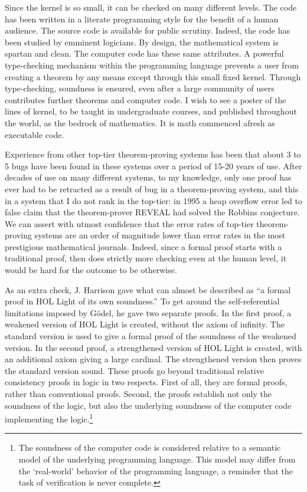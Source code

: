 \documentclass{llncs}
\begin{document}
Since the kernel is so small, it can be checked on many different levels.  The
code has been written in a literate programming style for the benefit
of a human audience.  The source code is available for public scrutiny.   Indeed, the code
has been studied by emminent logicians.  
By design, the mathematical system is spartan
and clean.  The computer code has these same attributes.   A powerful type-checking mechanism within the programming language prevents a user from creating a theorem by any means except through this small fixed kernel.  Through type-checking, soundness is ensured, even after
a large community of users contributes further theorems and computer code. 
I wish to see a poster of the lines of kernel, to be taught in undergraduate courses, and published throughout the world, as
the bedrock of mathematics.  It is math commenced afresh
as executable code.

Experience from other top-tier theorem-proving systems has been that about 3 to 5 bugs have been found
in these systems over a period of 15-20 years of use.  After decades of use on many different
systems, to my knowledge, only one proof
has ever had to be retracted as a result of bug in a theorem-proving system,
and this in a system that I do not rank in the top-tier:  in 1995
a heap overflow error led to false claim that the theorem-prover REVEAL had solved the Robbins
conjecture. %
We can assert with utmost confidence that 
the error rates of top-tier theorem-proving systems are an
order of magnitude lower than
error rates in the most prestigious mathematical journals.  Indeed, since a formal proof starts with
a traditional proof, then does strictly more checking even at the human level, 
it would be hard for the outcome to be otherwise.

As an extra check, J. Harrison gave what can almost be described as 
``a formal proof in HOL Light of its own soundness.''   To get around the self-referential limitations
imposed by G\"odel, he gave two separate proofs.  In the first proof, a weakened
version of HOL Light is created, without the axiom of infinity.  The standard version is
used to give a formal proof of the soundness of the weakened version.  In the second proof, a strengthened
version of HOL Light is created, with an additional axiom giving a large cardinal.  The strengthened
version then proves the standard version sound.  These proofs go beyond traditional relative consistency
proofs in logic in two respects.  First of all, they are formal proofs, rather than conventional proofs.
Second, the proofs establish not only the soundness of the logic, but also the underlying soundness
of the computer code implementing the logic.\footnote{The soundness of the computer code is considered
relative to a semantic model of the underlying programming language.  This model may differ from
the `real-world' behavior of the programming language, a reminder that the task of verification
is never complete.}
\end{document}
